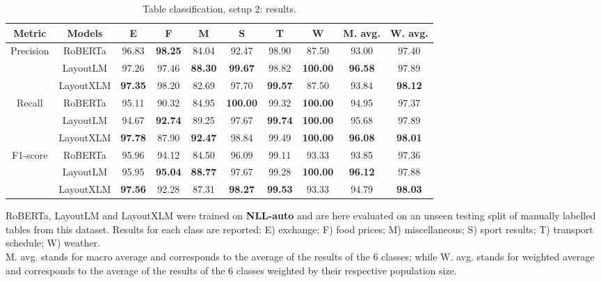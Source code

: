 \begin{table}[htp]
\begin{center}
\begin{tabular}{cc|cccccc|cc}
Metric & Models & E & F & M & S & T & W & M. avg. & W. avg.   \\
\hline
Precision & RoBERTa & 96.83 & \textbf{98.25} & 84.04 & 92.47 & 98.90 & 87.50 & 93.00 & 97.40\\
 & LayoutLM & 97.26 & 97.46 & \textbf{88.30} & \textbf{99.67} & 98.82 & \textbf{100.00} &  \textbf{96.58} & 97.89  \\
 & LayoutXLM & \textbf{97.35} & 98.20 & 82.69 & 97.70 & \textbf{99.57} & 87.50 & 93.84 & \textbf{98.12}  \\
 \hline
Recall & RoBERTa & 95.11 & 90.32 & 84.95 & \textbf{100.00} & 99.32 & \textbf{100.00} & 94.95 & 97.37\\
 & LayoutLM & 94.67 & \textbf{92.74} & 89.25 & 97.67 & \textbf{99.74} & \textbf{100.00} & 95.68 & 97.89  \\
  & LayoutXLM & \textbf{97.78} & 87.90 & \textbf{92.47} & 98.84 & 99.49 & \textbf{100.00} & \textbf{96.08} & \textbf{98.01}  \\
   \hline
 F1-score & RoBERTa & 95.96 & 94.12 & 84.50 & 96.09 & 99.11 & 93.33 & 93.85 & 97.36\\
 & LayoutLM & 95.95 & \textbf{95.04} & \textbf{88.77} & 97.67 & 99.28 & \textbf{100.00} & \textbf{96.12} & 97.88 \\
  & LayoutXLM & \textbf{97.56} & 92.28 & 87.31 & \textbf{98.27} & \textbf{99.53} & 93.33 & 94.79 & \textbf{98.03}  \\
   \hline
\end{tabular}
\end{center}
\caption{Table classification, setup 2: results.}
\medskip
\small
RoBERTa, LayoutLM and LayoutXLM were trained on \textbf{NLL-auto} and are here evaluated on an unseen testing split of manually labelled tables from this dataset. Results for each class are reported: E) exchange; F) food prices; M) miscellaneous; S) sport results; T) transport schedule; W) weather. \\
M. avg. stands for macro average and corresponds to the average of the results of the 6 classes; while W. avg. stands for weighted average and corresponds to the average of the results of the 6 classes weighted by their respective population size.
\label{table_classification_setup2_results}
\end{table}%

